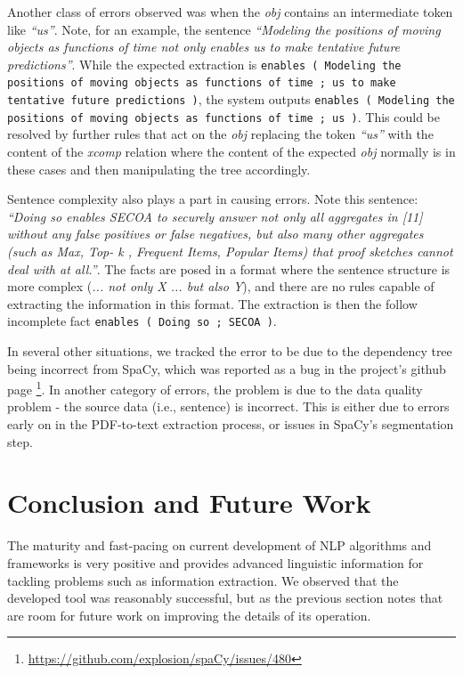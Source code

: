 \documentclass[11pt,a4paper,openright]{memoir}
\begin{document}
Another class of errors observed was when the \emph{obj} contains an intermediate token like \emph{\enquote{us}}. Note, for an example, the sentence \emph{\enquote{Modeling the positions of moving objects as functions of time not only enables us to make tentative future predictions}}. While the expected extraction is \texttt{enables	( Modeling the positions of moving objects as functions of time ; us to make tentative future predictions )}, the system outputs \texttt{enables	( Modeling the positions of moving objects as functions of time ; us )}. This could be resolved by further rules that act on the \emph{obj} replacing the token \emph{\enquote{us}} with the content of the \emph{xcomp} relation where the content of the expected \emph{obj} normally is in these cases and then manipulating the tree accordingly.

Sentence complexity also plays a part in causing errors. Note this sentence: \emph{\enquote{Doing so enables SECOA to securely answer not only all aggregates in [11] without any false positives or false negatives, but also many other aggregates (such as Max, Top- k , Frequent Items, Popular Items) that proof sketches cannot deal with at all.}}. The facts are posed in a format where the sentence structure is more complex (\emph{... not only X ... but also Y}), and there are no rules capable of extracting the information in this format. The extraction is then the follow incomplete fact \texttt{enables	( Doing so ; SECOA )}.

In several other situations, we tracked the error to be due to the dependency tree being incorrect from SpaCy, which was reported as a bug in the project's github page \footnote{\url{https://github.com/explosion/spaCy/issues/480}}. In another category of errors, the problem is due to the data quality problem - the source data (i.e., sentence) is incorrect. This is either due to errors early on in the PDF-to-text extraction process, or issues in SpaCy's segmentation step.


%
%
%
%


\chapter{Conclusion and Future Work}
\label{chapter:conclusion}

The maturity and fast-pacing on current development of NLP algorithms and frameworks is very positive and provides advanced linguistic information for tackling problems such as information extraction. We observed that the developed tool was reasonably successful, but as the previous section notes that are room for future work on improving the details of its operation.
\end{document}
